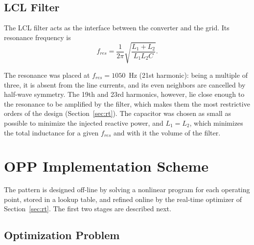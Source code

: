 \documentclass[conference]{IEEEtran}
\begin{document}
\subsection{LCL Filter}
\label{sec:filtro}

The LCL filter acts as the interface between the converter and the grid. Its
resonance frequency is
\begin{equation}
    f_{res} = \frac{1}{2\pi}\sqrt{\frac{L_1+L_2}{L_1L_2C}}.
    \label{eq:fres}
\end{equation}

The resonance was placed at $f_{res}=1050$~Hz (21st harmonic):
being a multiple of three, it is absent from the line currents, and its even
neighbors are cancelled by half-wave symmetry. The 19th and 23rd harmonics,
however, lie close enough to the resonance to be amplified by the filter,
which makes them the most restrictive orders of the design
(Section~\ref{sec:rt}). The capacitor was chosen as small as possible to
minimize the injected reactive power, and $L_1=L_2$, which minimizes the
total inductance for a given $f_{res}$ and with it the volume of the
filter.

\section{OPP Implementation Scheme}

The pattern is designed off-line by solving a nonlinear program
for each operating point, stored in a lookup table, and refined online by the
real-time optimizer of Section~\ref{sec:rt}. The first two stages are
described next.


\subsection{Optimization Problem}
\end{document}
